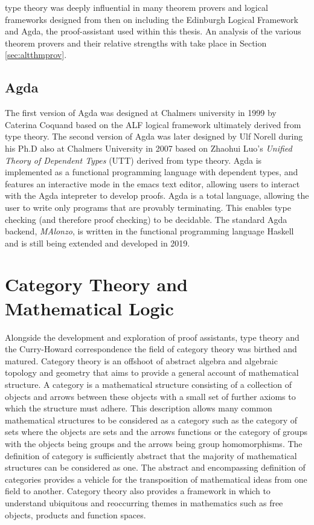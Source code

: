 \mlt{} type theory was deeply influential in many theorem provers and
logical frameworks designed from then on including the Edinburgh Logical
Framework \cite{harper1993framework} and  Agda, the proof-assistant used within this thesis. An analysis of
the various theorem provers and their relative strengths with take place in
Section
\ref{sec:altthmprov}.

\subsection{Agda}
The first version of Agda was designed at Chalmers university in 1999 by
Caterina Coquand \cite{coquand2000agda} based on the ALF logical framework
\cite{magnusson1993alf} ultimately derived from
\mlt type theory. The second version of Agda was later designed by Ulf
Norell during his Ph.D also at Chalmers University in 2007
\cite{norell2007towards} based on Zhaohui Luo's
\textit{Unified Theory of Dependent Types} (UTT)  \cite{luo1992unifying} derived from \mlt type
theory. Agda is implemented as a functional programming language with dependent
types, and features an interactive mode in the emacs text editor, allowing users
to interact with the Agda intepreter to develop proofs. Agda is a total
language, allowing the user to write only programs that are provably
terminating. This enables type checking (and therefore proof checking) to be
decidable. The standard Agda backend, \textit{MAlonzo}, is written in the
functional programming language Haskell and is still being extended and
developed in 2019.
\section{Category Theory and Mathematical Logic}
Alongside the development and exploration of  proof assistants, type theory and
the Curry-Howard correspondence the field of category theory was birthed and
matured. Category theory is an offshoot of abstract algebra and algebraic
topology and geometry that aims to provide a general account of mathematical
structure. A category is a mathematical structure consisting of a collection of
objects and arrows between these objects with a small set of further axioms to
which the structure must adhere. This description allows many common
mathematical structures to be considered as a category such as the category of
sets where the objects are sets and the arrows functions or the category of
groups with the objects being groups and the arrows being group homomorphisms.
The definition of category is sufficiently abstract that the majority of
mathematical structures can be considered as one. The abstract and encompassing
definition of categories provides a vehicle for the transposition of
mathematical ideas from one field to another. Category theory also provides a
framework in which to understand ubiquitous and reoccurring themes in mathematics
such as free objects, products and function spaces.
